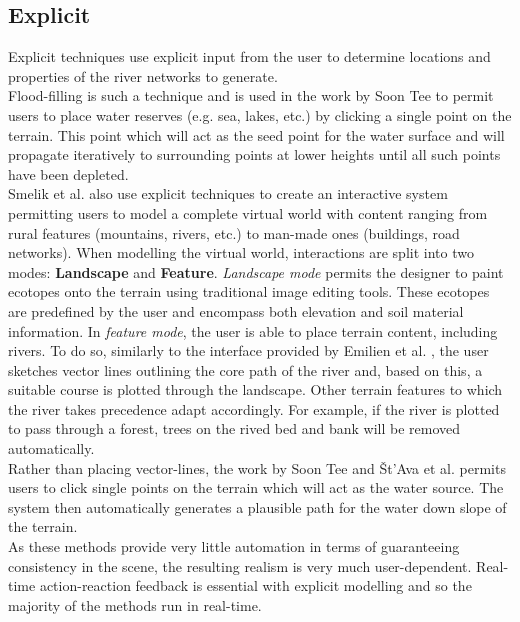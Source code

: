 \subsection{Explicit}

Explicit techniques use explicit input from the user to determine locations and properties of the river networks to generate.\\

Flood-filling is such a technique and is used in the work by Soon Tee \cite{Teoh2008} to permit users to place water reserves (e.g. sea, lakes, etc.) by clicking a single point on the terrain. This point which will act as the seed point for the water surface and will propagate iteratively to surrounding points at lower heights until all such points have been depleted. \\

Smelik et al. also use explicit techniques to create an interactive system permitting users to model a complete virtual world with content ranging from rural features (mountains, rivers, etc.) to man-made ones (buildings, road networks). When modelling the virtual world, interactions are split into two modes: \textbf{Landscape} and \textbf{Feature}. \textit{Landscape mode} permits the designer to paint ecotopes onto the terrain using traditional image editing tools. These ecotopes are predefined by the user and encompass both elevation and soil material information. In \textit{feature mode}, the user is able to place terrain content, including rivers. To do so, similarly to the interface provided by Emilien et al. \cite{Emilien2014}, the user sketches vector lines outlining the core path of the river and, based on this, a suitable course is plotted through the landscape. Other terrain features to which the river takes precedence adapt accordingly. For example, if the river is plotted to pass through a forest, trees on the rived bed and bank will be removed automatically. \\

Rather than placing vector-lines, the work by Soon Tee \cite{Teoh2008} and Št'Ava et al. \cite{StAva2008} permits users to click single points on the terrain which will act as the water source. The system then automatically generates a plausible path for the water down slope of the terrain.\\

As these methods provide very little automation in terms of guaranteeing consistency in the scene, the resulting realism is very much user-dependent. Real-time action-reaction feedback is essential with explicit modelling and so the majority of the methods run in real-time.

